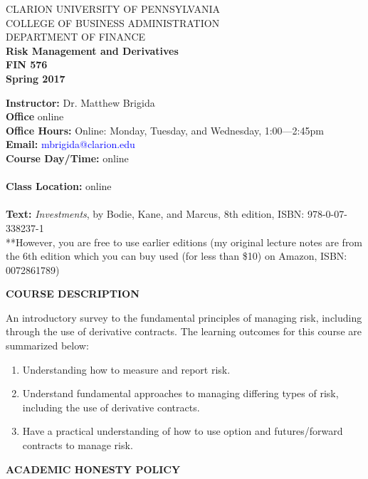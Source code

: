 \documentclass[11pt]{article}
\author{Matthew Brigida, Ph.D.}
\date{\today}
\title{}
\begin{document}
\begin{center}
CLARION UNIVERSITY OF PENNSYLVANIA\\
COLLEGE OF BUSINESS ADMINISTRATION\\
DEPARTMENT OF FINANCE
\\
\textbf{Risk Management and Derivatives} \\
\textbf{FIN  576}\\
\textbf{Spring 2017}\\
\end{center}

\vspace{6.5pt}
\noindent \textbf{Instructor:} Dr. Matthew Brigida\\
\textbf{Office} online\\
\textbf{Office Hours:}  Online:  Monday, Tuesday, and Wednesday, 1:00---2:45pm \\
\textbf{Email:}  \textcolor{blue}{mbrigida@clarion.edu} \\
\textbf{Course Day/Time:} online\\
\\
\textbf{Class Location:} online \\
\\
\textbf{Text:} \emph{Investments}, by Bodie, Kane, and Marcus, 8th edition, ISBN:  978-0-07-338237-1 \\
\hspace*{20pt} **However, you are free to use earlier editions (my original lecture notes are from the 6th edition which you can buy used (for less than \$10) on Amazon, ISBN: 0072861789)\\
\begin{center}
\textbf{COURSE DESCRIPTION}
\end{center}
An introductory survey to the fundamental principles of managing risk, including through the use of derivative contracts. The learning outcomes for this course are summarized below:
\begin{enumerate}
\item Understanding how to measure and report risk.
\item Understand fundamental approaches to managing differing types of risk, including the use of derivative contracts.
\item Have a practical understanding of how to use option and futures/forward contracts to manage risk.
\end{enumerate}
\begin{center}
\textbf{ACADEMIC HONESTY POLICY}
\end{center}
\end{document}
